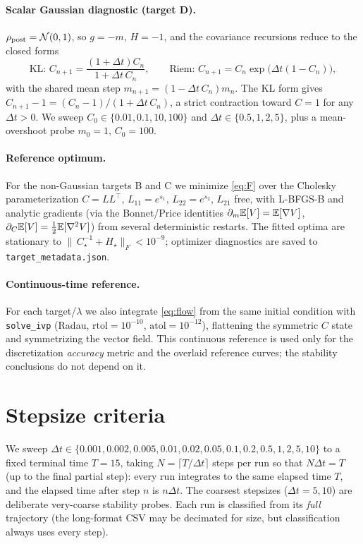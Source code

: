 \documentclass[11pt]{article}
\begin{document}
\paragraph{Scalar Gaussian diagnostic (target D).}
$\rho_{\mathrm{post}}=\mathcal{N}(0,1)$, so $g=-m$, $H=-1$, and the covariance recursions reduce to
the closed forms
\begin{equation}\label{eq:scalar}
\text{KL: }C_{n+1}=\frac{(1+\Delta t)C_n}{1+\Delta t\,C_n},
\qquad
\text{Riem: }C_{n+1}=C_n\exp\!\big(\Delta t(1-C_n)\big),
\end{equation}
with the shared mean step $m_{n+1}=(1-\Delta t\,C_n)m_n$. The KL form gives
$C_{n+1}-1=(C_n-1)/(1+\Delta t\,C_n)$, a strict contraction toward $C=1$ for any
$\Delta t>0$. We sweep $C_0\in\{0.01,0.1,10,100\}$ and
$\Delta t\in\{0.5,1,2,5\}$, plus a mean-overshoot probe $m_0=1$, $C_0=100$.

\paragraph{Reference optimum.}
For the non-Gaussian targets B and C we minimize \eqref{eq:F} over the Cholesky
parameterization $C=LL^\top$, $L_{11}=e^{s_1}$, $L_{22}=e^{s_2}$, $L_{21}$ free,
with L-BFGS-B and analytic gradients (via the Bonnet/Price identities
$\partial_m\mathbb{E}[V]=\mathbb{E}[\nabla V]$, $\partial_C\mathbb{E}[V]=\tfrac12\mathbb{E}[\nabla^2 V]$) from several
deterministic restarts. The fitted optima are stationary to
$\|\,C_\star^{-1}+H_\star\|_F<10^{-9}$; optimizer diagnostics are saved to
\texttt{target\_metadata.json}.

\paragraph{Continuous-time reference.}
For each target/$\lambda$ we also integrate \eqref{eq:flow} from the same initial
condition with \texttt{solve\_ivp} (Radau, $\mathrm{rtol}=10^{-10}$,
$\mathrm{atol}=10^{-12}$), flattening the symmetric $C$ state and symmetrizing the
vector field. This continuous reference is used only for the discretization
\emph{accuracy} metric and the overlaid reference curves; the stability
conclusions do not depend on it.

\section{Stepsize criteria}\label{sec:criteria}

We sweep
$\Delta t\in\{0.001,0.002,0.005,0.01,0.02,0.05,0.1,0.2,0.5,1,2,5,10\}$
to a fixed terminal time $T=15$, taking $N=\lceil T/\Delta t\rceil$ steps per run
so that $N\Delta t=T$ (up to the final partial step): every run integrates to the
same elapsed time $T$, and the elapsed time after step $n$ is $n\Delta t$. The
coarsest stepsizes ($\Delta t=5,10$) are deliberate very-coarse
stability probes. Each run is classified from its \emph{full} trajectory (the
long-format CSV may be decimated for size, but classification always uses every
step).
\end{document}
